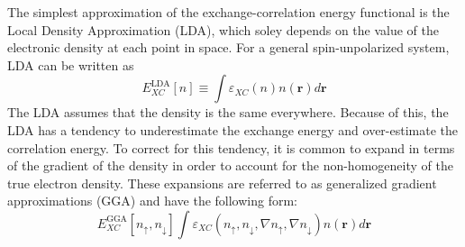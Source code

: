 \documentclass[12pt]{article}
\begin{document}
The simplest approximation of the exchange-correlation energy functional is the Local Density Approximation (LDA), which soley depends on the value of the electronic density at each point in space. For a general spin-unpolarized system, LDA can be written as 
\begin{equation*}
    E_{XC}^{\mathrm{LDA}}[n] \equiv \int \varepsilon_{XC}(n)n(\textbf{r})d\textbf{r}
\end{equation*}
The LDA assumes that the density is the same everywhere. Because of this, the LDA has a tendency to underestimate the exchange energy and over-estimate the correlation energy. To correct for this tendency, it is common to expand in terms of the gradient of the density in order to account for the non-homogeneity of the true electron density. These expansions are referred to as generalized gradient approximations (GGA) and have the following form:
\begin{equation*}
    E_{XC}^{\mathrm{GGA}}[n_{\uparrow},n_{\downarrow}]\int \varepsilon_{XC}(n_{\uparrow},n_{\downarrow},\nabla n_{\uparrow},\nabla n_{\downarrow})n(\textbf{r})d\textbf{r}
\end{equation*}
\end{document}

